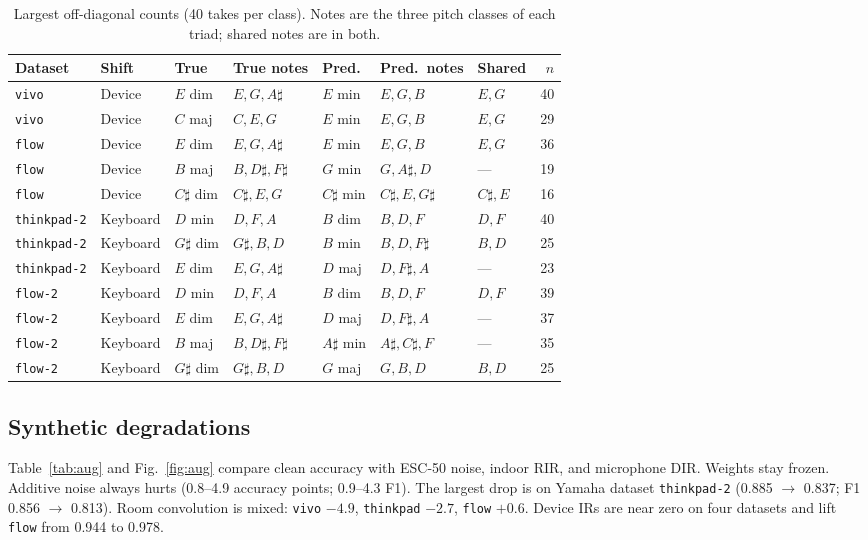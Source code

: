 \documentclass[pdflatex,sn-mathphys-num,iicol]{sn-jnl}
\theoremstyle{thmstyleone}
\theoremstyle{thmstyletwo}
\theoremstyle{thmstylethree}
\begin{document}
\begin{table}[t]
\caption{Largest off-diagonal counts (40 takes per class). Notes are the three pitch classes of each triad; shared notes are in both.}\label{tab:pairs}
\setlength{\tabcolsep}{3.5pt}
\begin{tabular*}{\textwidth}{@{\extracolsep{\fill}}lllllllr@{}}
\toprule
Dataset & Shift & True & True notes & Pred. & Pred.\ notes & Shared & $n$ \\
\midrule
\texttt{vivo} & Device & $E$ dim & $E,G,A\sharp$ & $E$ min & $E,G,B$ & $E,G$ & 40 \\
\texttt{vivo} & Device & $C$ maj & $C,E,G$ & $E$ min & $E,G,B$ & $E,G$ & 29 \\
\texttt{flow} & Device & $E$ dim & $E,G,A\sharp$ & $E$ min & $E,G,B$ & $E,G$ & 36 \\
\texttt{flow} & Device & $B$ maj & $B,D\sharp,F\sharp$ & $G$ min & $G,A\sharp,D$ & --- & 19 \\
\texttt{flow} & Device & $C\sharp$ dim & $C\sharp,E,G$ & $C\sharp$ min & $C\sharp,E,G\sharp$ & $C\sharp,E$ & 16 \\
\texttt{thinkpad-2} & Keyboard & $D$ min & $D,F,A$ & $B$ dim & $B,D,F$ & $D,F$ & 40 \\
\texttt{thinkpad-2} & Keyboard & $G\sharp$ dim & $G\sharp,B,D$ & $B$ min & $B,D,F\sharp$ & $B,D$ & 25 \\
\texttt{thinkpad-2} & Keyboard & $E$ dim & $E,G,A\sharp$ & $D$ maj & $D,F\sharp,A$ & --- & 23 \\
\texttt{flow-2} & Keyboard & $D$ min & $D,F,A$ & $B$ dim & $B,D,F$ & $D,F$ & 39 \\
\texttt{flow-2} & Keyboard & $E$ dim & $E,G,A\sharp$ & $D$ maj & $D,F\sharp,A$ & --- & 37 \\
\texttt{flow-2} & Keyboard & $B$ maj & $B,D\sharp,F\sharp$ & $A\sharp$ min & $A\sharp,C\sharp,F$ & --- & 35 \\
\texttt{flow-2} & Keyboard & $G\sharp$ dim & $G\sharp,B,D$ & $G$ maj & $G,B,D$ & $B,D$ & 25 \\
\bottomrule
\end{tabular*}
\end{table}

\subsection{Synthetic degradations}\label{subsec4_5}

Table~\ref{tab:aug} and Fig.~\ref{fig:aug} compare clean accuracy with ESC-50 noise, indoor RIR, and microphone DIR. Weights stay frozen. Additive noise always hurts (0.8--4.9 accuracy points; 0.9--4.3 F1). The largest drop is on Yamaha dataset \texttt{thinkpad-2} (0.885 $\to$ 0.837; F1 0.856 $\to$ 0.813). Room convolution is mixed: \texttt{vivo} $-4.9$, \texttt{thinkpad} $-2.7$, \texttt{flow} $+0.6$. Device IRs are near zero on four datasets and lift \texttt{flow} from 0.944 to 0.978.
\end{document}
